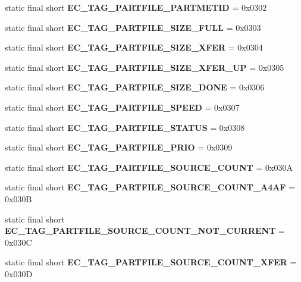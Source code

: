 \begin{DoxyCompactItemize}
\item 
static final short {\bfseries EC\_\-TAG\_\-PARTFILE\_\-PARTMETID} = 0x0302\label{interfaceECCodes_ac0d08edef3a70b00795f07dc5ce63e88}

\item 
static final short {\bfseries EC\_\-TAG\_\-PARTFILE\_\-SIZE\_\-FULL} = 0x0303\label{interfaceECCodes_a2fc2563d71d8e232afe27aa3efa30775}

\item 
static final short {\bfseries EC\_\-TAG\_\-PARTFILE\_\-SIZE\_\-XFER} = 0x0304\label{interfaceECCodes_a702185f901ae23be5b74caa61f9b6112}

\item 
static final short {\bfseries EC\_\-TAG\_\-PARTFILE\_\-SIZE\_\-XFER\_\-UP} = 0x0305\label{interfaceECCodes_a64968856b8985a1afd3d99dbb03685d7}

\item 
static final short {\bfseries EC\_\-TAG\_\-PARTFILE\_\-SIZE\_\-DONE} = 0x0306\label{interfaceECCodes_a6c0dc47d8780299817d282d577a4acb7}

\item 
static final short {\bfseries EC\_\-TAG\_\-PARTFILE\_\-SPEED} = 0x0307\label{interfaceECCodes_a3e183595c48484ffb0f3838c6cb4f13f}

\item 
static final short {\bfseries EC\_\-TAG\_\-PARTFILE\_\-STATUS} = 0x0308\label{interfaceECCodes_a648b489a4a296411023b681415b481e5}

\item 
static final short {\bfseries EC\_\-TAG\_\-PARTFILE\_\-PRIO} = 0x0309\label{interfaceECCodes_a1d2bd403075c1bfcff29839aca7e3c37}

\item 
static final short {\bfseries EC\_\-TAG\_\-PARTFILE\_\-SOURCE\_\-COUNT} = 0x030A\label{interfaceECCodes_a5900c7691516e2ba6ab62937286201ae}

\item 
static final short {\bfseries EC\_\-TAG\_\-PARTFILE\_\-SOURCE\_\-COUNT\_\-A4AF} = 0x030B\label{interfaceECCodes_adcf96c3db1915dabb73a79303905e271}

\item 
static final short {\bfseries EC\_\-TAG\_\-PARTFILE\_\-SOURCE\_\-COUNT\_\-NOT\_\-CURRENT} = 0x030C\label{interfaceECCodes_a63e39992dbf2d95eda03a798b0a348a6}

\item 
static final short {\bfseries EC\_\-TAG\_\-PARTFILE\_\-SOURCE\_\-COUNT\_\-XFER} = 0x030D\label{interfaceECCodes_a51369d91832d36d0a5fe7e3368cb2cca}


\end{DoxyCompactItemize}
